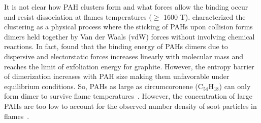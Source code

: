 
 

It is not clear how PAH clusters form and what forces allow the binding occur and resist dissociation at flames temperatures ($\ge$ 1600 T). \citet{frenklach2002reaction} characterized the clustering as a physical process where the sticking of PAHs upon collision forms dimers held together by Van der Waals (vdW) forces without involving chemical reactions. In fact, \citet{herdman2008intermolecular} found that the binding energy of PAHs dimers due to dispersive and electorstatic forces increases linearly with molecular mass and reaches the limit of exfoliation energy for graphite. However, the entropy barrier of dimerization increases with PAH size making them unfavorable under equilibrium conditions. So, PAHs as large as circumcoronene ($\mathrm{C_{54}H_{18}}$) can only form dimer to survive flame temperatures~\citep{Wang2011}. However, the concentration of large PAHs are too low to account for the observed number density of soot particles in flames~\citep{totton2012quantitative}. 

